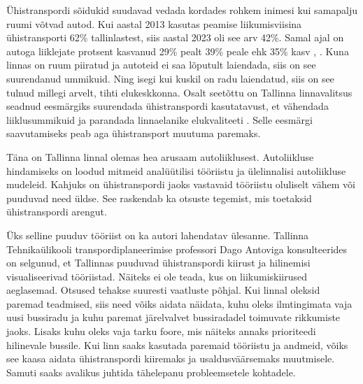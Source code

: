 Ühistranspordi sõidukid suudavad vedada kordades rohkem inimesi kui samapalju ruumi võtvad autod. Kui aastal 2013 kasutas peamise liikumisviisina ühistransporti 62\% tallinlastest, siis aastal 2023 oli see arv 42\%. Samal ajal on autoga liiklejate protsent kasvanud 29\% pealt 39\% peale ehk 35\% kasv \cite{tallinlasteRahalolukusitlus2020},  \cite{tallinlasteRahalolukusitlus2023}. Kuna linnas on ruum piiratud ja autoteid ei saa lõputult laiendada, siis on see suurendanud ummikuid. Ning isegi kui kuskil on radu laiendatud, siis on see tulnud millegi arvelt, tihti elukeskkonna. Osalt seetõttu on Tallinna linnavalitsus seadnud eesmärgiks suurendada ühistranspordi kasutatavust, et vähendada liiklusummikuid ja parandada linnaelanike elukvaliteeti \cite{tallinn2035}. Selle eesmärgi saavutamiseks peab aga ühistransport muutuma paremaks.

Täna on Tallinna linnal olemas hea arusaam autoliiklusest. Autoliikluse hindamiseks on loodud mitmeid analüütilisi tööriistu ja ülelinnalisi autoliikluse mudeleid. Kahjuks on ühistranspordi jaoks vastavaid tööriistu oluliselt vähem või puuduvad need üldse. See raskendab ka otsuste tegemist, mis toetaksid ühistranspordi arengut.

Üks selline puuduv tööriist on ka autori lahendatav ülesanne. Tallinna Tehnikaülikooli transpordiplaneerimise professori Dago Antoviga konsulteerides on selgunud, et Tallinnas puuduvad ühistranspordi kiirust ja hilinemisi visualiseerivad tööriistad. Näiteks ei ole teada, kus on liikumiskiirused aeglasemad. Otsused tehakse suuresti vaatluste põhjal. Kui linnal oleksid paremad teadmised, siis need võiks aidata näidata, kuhu oleks ilmtingimata vaja uusi bussiradu ja kuhu paremat järelvalvet bussiradadel toimuvate rikkumiste jaoks. Lisaks kuhu oleks vaja tarku foore, mis näiteks annaks prioriteedi hilinevale bussile. Kui linn saaks kasutada paremaid tööriistu ja andmeid, võiks see kaasa aidata ühistranspordi kiiremaks ja usaldusväärsemaks muutmisele. Samuti saaks avalikus juhtida tähelepanu probleemsetele kohtadele.
